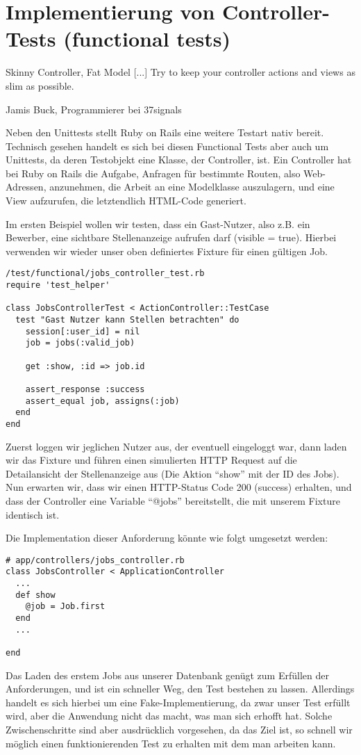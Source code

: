 \section{Implementierung von Controller-Tests (functional tests)}
\epigraph{Skinny Controller, Fat Model [...] Try to keep your controller actions and views as slim as possible.}{Jamis Buck, Programmierer bei 37signals}

Neben den Unittests stellt Ruby on Rails eine weitere Testart nativ bereit. Technisch gesehen handelt es sich bei diesen Functional Tests aber auch um Unittests, da deren Testobjekt eine Klasse, der Controller, ist. 
Ein Controller hat bei Ruby on Rails die Aufgabe, Anfragen für bestimmte Routen, also Web-Adressen, anzunehmen, die Arbeit an eine Modelklasse auszulagern, und eine View aufzurufen, die letztendlich HTML-Code generiert.

Im ersten Beispiel wollen wir testen, dass ein Gast-Nutzer, also z.B. ein Bewerber, eine sichtbare Stellenanzeige aufrufen darf (visible = true). Hierbei verwenden wir wieder unser oben definiertes Fixture für einen gültigen Job.
\begin{lstlisting}
/test/functional/jobs_controller_test.rb 
require 'test_helper'

class JobsControllerTest < ActionController::TestCase
  test "Gast Nutzer kann Stellen betrachten" do
    session[:user_id] = nil
    job = jobs(:valid_job)
    
    get :show, :id => job.id
    
    assert_response :success
    assert_equal job, assigns(:job)
  end
end
\end{lstlisting}
\tddred
Zuerst loggen wir jeglichen Nutzer aus, der eventuell eingeloggt war, dann laden wir das Fixture und führen einen simulierten HTTP Request auf die Detailansicht der Stellenanzeige aus (Die Aktion "`show"' mit der ID des Jobs).
Nun erwarten wir, dass wir einen HTTP-Status Code 200 (success) erhalten, und dass der Controller eine Variable "`@jobs"' bereitstellt, die mit unserem Fixture identisch ist.

Die Implementation dieser Anforderung könnte wie folgt umgesetzt werden:
\begin{lstlisting}
# app/controllers/jobs_controller.rb
class JobsController < ApplicationController
  ...
  def show
    @job = Job.first
  end
  ...
  
end
\end{lstlisting}
\tddgreen
Das Laden des erstem Jobs aus unserer Datenbank genügt zum Erfüllen der Anforderungen, und ist ein schneller Weg, den Test bestehen zu lassen. Allerdings handelt es sich hierbei um eine Fake-Implementierung, da zwar unser Test erfüllt wird, aber die Anwendung nicht das macht, was man sich erhofft hat. Solche Zwischenschritte sind aber ausdrücklich vorgesehen, da das Ziel ist, so schnell wir möglich einen funktionierenden Test zu erhalten mit dem man arbeiten kann.

